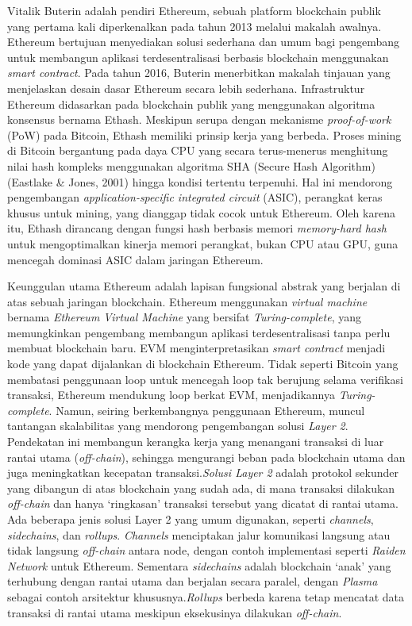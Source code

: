Vitalik Buterin adalah pendiri Ethereum, sebuah platform blockchain publik yang
pertama kali diperkenalkan pada tahun 2013 melalui makalah awalnya. Ethereum
bertujuan menyediakan solusi sederhana dan umum bagi pengembang untuk membangun
aplikasi terdesentralisasi berbasis blockchain menggunakan \emph{smart
  contract}. Pada tahun 2016, Buterin menerbitkan makalah tinjauan yang
menjelaskan desain dasar Ethereum secara lebih sederhana. Infrastruktur
Ethereum didasarkan pada blockchain publik yang menggunakan algoritma konsensus
bernama Ethash.\parencite{Buterin2016} Meskipun serupa dengan mekanisme
\emph{proof-of-work} (PoW) pada Bitcoin, Ethash memiliki prinsip kerja yang
berbeda. Proses mining di Bitcoin bergantung pada daya CPU yang secara
terus-menerus menghitung nilai hash kompleks menggunakan algoritma SHA (Secure
Hash Algorithm) (Eastlake \& Jones, 2001) hingga kondisi tertentu terpenuhi.
Hal ini mendorong pengembangan \emph{application-specific integrated circuit}
(ASIC), perangkat keras khusus untuk mining, yang dianggap tidak cocok untuk
Ethereum. Oleh karena itu, Ethash dirancang dengan fungsi hash berbasis memori
\emph{memory-hard hash} untuk mengoptimalkan kinerja memori perangkat, bukan
CPU atau GPU, guna mencegah dominasi ASIC dalam jaringan Ethereum.

Keunggulan utama Ethereum adalah lapisan fungsional abstrak yang berjalan di
atas sebuah jaringan blockchain. Ethereum menggunakan \emph{virtual machine}
bernama \emph{Ethereum Virtual Machine} yang bersifat \emph{Turing-complete},
yang memungkinkan pengembang membangun aplikasi terdesentralisasi tanpa perlu
membuat blockchain baru. EVM menginterpretasikan \emph{smart contract} menjadi
kode yang dapat dijalankan di blockchain Ethereum. Tidak seperti Bitcoin yang
membatasi penggunaan loop untuk mencegah loop tak berujung selama verifikasi
transaksi, Ethereum mendukung loop berkat EVM, menjadikannya
\emph{Turing-complete}. Namun, seiring berkembangnya penggunaan Ethereum,
muncul tantangan skalabilitas yang mendorong pengembangan solusi \emph{Layer
  2}. Pendekatan ini membangun kerangka kerja yang menangani transaksi di luar
rantai utama (\emph{off-chain}), sehingga mengurangi beban pada blockchain
utama dan juga meningkatkan kecepatan transaksi.\emph{Solusi Layer 2} adalah
protokol sekunder yang dibangun di atas blockchain yang sudah ada, di mana
transaksi dilakukan \emph{off-chain} dan hanya `ringkasan' transaksi tersebut
yang dicatat di rantai utama. Ada beberapa jenis solusi Layer 2 yang umum
digunakan, seperti \emph{channels}, \emph{sidechains}, dan \emph{rollups}.
\emph{Channels} menciptakan jalur komunikasi langsung atau tidak langsung
\emph{off-chain} antara node, dengan contoh implementasi seperti \emph{Raiden
  Network} untuk Ethereum. Sementara \emph{sidechains} adalah blockchain `anak'
yang terhubung dengan rantai utama dan berjalan secara paralel, dengan
\emph{Plasma} sebagai contoh arsitektur khususnya.\emph{Rollups} berbeda karena
tetap mencatat data transaksi di rantai utama meskipun eksekusinya dilakukan
\emph{off-chain}.

